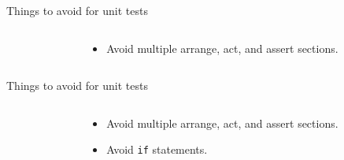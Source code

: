 \documentclass[english,10pt,aspectratio=169,t]{beamer}
\begin{document}
\begin{frame}{Things to avoid for unit tests}
  \begin{columns}[T]
    \begin{column}[]{0.5\textwidth}
      \begin{minipage}{\linewidth}
        \begin{center}
        \end{center}
      \end{minipage}
    \end{column}
    \begin{column}[]{0.5\textwidth}
      \begin{itemize}
        \item Avoid multiple arrange, act, and assert sections.
      \end{itemize}
    \end{column}
  \end{columns}
\end{frame}

\begin{frame}{Things to avoid for unit tests}
  \begin{columns}[T]
    \begin{column}[]{0.5\textwidth}
      \begin{minipage}{\linewidth}
        \avoidifpkd
      \end{minipage}
    \end{column}
    \begin{column}[]{0.5\textwidth}
      \begin{itemize}
        \item Avoid multiple arrange, act, and assert sections.
        \item Avoid \texttt{if} statements. 
      \end{itemize}
    \end{column}
  \end{columns}
\end{frame}
\end{document}
